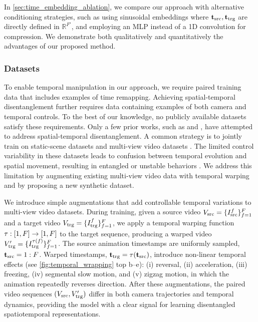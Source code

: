 In \cref{sec:time_embedding_ablation}, we compare our approach with alternative conditioning strategies, such as using sinusoidal embeddings where $\mathbf{t}_{\text{src}},\mathbf{t}_{\text{trg}}$ are directly defined in $\mathbb{R}^{F'}$, and employing an MLP instead of a 1D convolution for compression. We demonstrate both qualitatively and quantitatively the advantages of our proposed method.



\subsubsection{Datasets}
\label{sec:datasets}
To enable temporal manipulation in our approach, we require paired training data that includes examples of time remapping. 
Achieving spatial-temporal disentanglement further requires data containing examples of both camera and temporal controls. 
To the best of our knowledge, no publicly available datasets satisfy these requirements.
Only a few prior works, such as \fourdim \cite{watson2025controllingspacetimediffusion} and \catfourd \cite{Wu2024}, have attempted to address spatial-temporal disentanglement. 
A common strategy is to jointly train on static-scene datasets and multi-view video datasets \cite{zhou2018stereo,ling2024dl3dv}. 
The limited control variability in these datasets leads to confusion between temporal evolution and spatial movement, resulting in entangled or unstable behaviors \cite{watson2025controllingspacetimediffusion,Wu2024}. 
We address this limitation by augmenting existing multi-view video data with temporal warping and by proposing a new synthetic dataset.


We introduce simple augmentations that add controllable temporal variations to multi-view video datasets.
During training, given a source video $V_{\text{src}} = \{I_{\text{src}}^f\}_{f=1}^{F}$ and a target video $V_{\text{trg}} = \{I_{\text{trg}}^f\}_{f=1}^{F}$, we apply a temporal warping function $\tau: [1, F] \rightarrow [1, F]$ to the target sequence, producing a warped video $V_{\text{trg}}' = \{I_{\text{trg}}^{\tau(f)}\}_{f=1}^{F}$. 
The source animation timestamps are uniformly sampled, $\mathbf{t}_{\text{src}} = 1:F$. 
Warped timestamps, $\mathbf{t}_{\text{trg}} = \tau(\mathbf{t}_{\text{src}})$, introduce non-linear temporal effects (see \cref{fig:temporal_wrapping} top b–e): (i) reversal, (ii) acceleration, (iii) freezing, (iv) segmental slow motion, and (v) zigzag motion, in which the animation repeatedly reverses direction.
After these augmentations, the paired video sequences $(V_{\text{src}}, V_{\text{trg}}')$ differ in both camera trajectories and temporal dynamics, providing the model with a clear signal for learning disentangled spatiotemporal representations.




